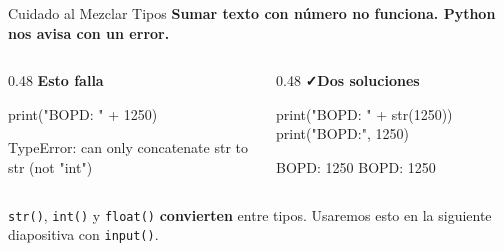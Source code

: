 \documentclass[aspectratio=169, 11pt]{beamer}
\begin{document}
\begin{frame}[fragile,shrink=10]{Cuidado al Mezclar Tipos}
  \vspace{-6pt}
  {\small\color{arcaDark}\bfseries
    Sumar texto con número no funciona. Python nos avisa con un error.}

  \vspace{6pt}
  \begin{columns}[T]
    \begin{column}{0.48\textwidth}
      {\scriptsize\color{arcaRed}\bfseries\faTimes\hspace{4pt}Esto falla}
      \begin{pyblock}
print("BOPD: " + 1250)
      \end{pyblock}
      \vspace{2pt}
      \begin{outputblock}
TypeError: can only concatenate
str to str (not "int")
      \end{outputblock}
    \end{column}

    \begin{column}{0.48\textwidth}
      {\scriptsize\color{codeGreen}\bfseries\faCheck\hspace{4pt}Dos soluciones}
      \begin{pyblock}
print("BOPD: " + str(1250))
print("BOPD:", 1250)
      \end{pyblock}
      \vspace{2pt}
      \begin{outputblock}
BOPD: 1250
BOPD: 1250
      \end{outputblock}
    \end{column}
  \end{columns}

  \vspace{6pt}
  {\footnotesize\color{textMuted}
    \faLightbulb[regular]\hspace{4pt}%
    \texttt{str()}, \texttt{int()} y \texttt{float()} \textbf{convierten} entre tipos.
    Usaremos esto en la siguiente diapositiva con \texttt{input()}.}
\end{frame}
\end{document}
